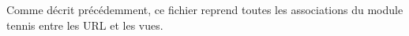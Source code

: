 Comme décrit précédemment, ce fichier reprend toutes les associations du module tennis entre les URL et les vues.






